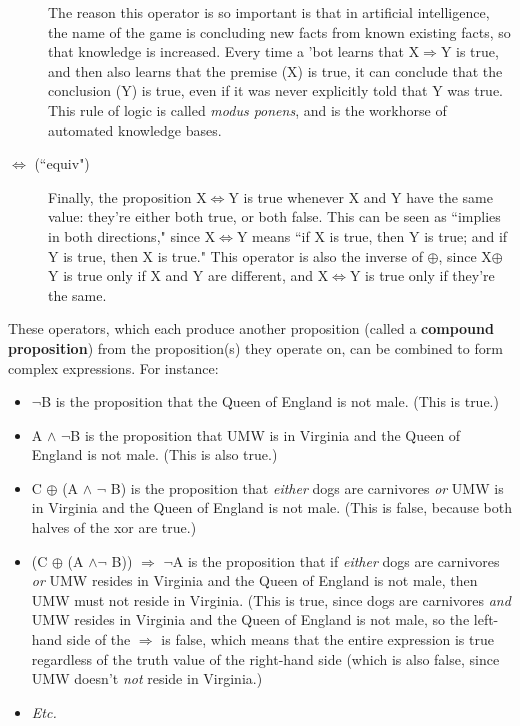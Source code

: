 \begin{description}
The reason this operator is so important is that in artificial
intelligence, the name of the game is concluding new facts from known
existing facts, so that knowledge is increased. Every time a 'bot learns
that X$\Rightarrow$Y is true, and then also learns that the premise (X) is
true, it can conclude that the conclusion (Y) is true, even if it was
never explicitly told that Y was true. This rule of logic is called
\textit{modus ponens}, and is the workhorse of automated knowledge bases.

\item[$\Leftrightarrow$ (``equiv")] Finally, the proposition
X$\Leftrightarrow$Y is true whenever X and Y have the same value: they're
either both true, or both false. This can be seen as ``implies in both
directions," since X$\Leftrightarrow$Y means ``if X is true, then Y is
true; and if Y is true, then X is true." This operator is also the inverse
of $\oplus$, since X$\oplus$Y is true only if X and Y are different, and
X$\Leftrightarrow$Y is true only if they're the same.

\end{description}

These operators, which each produce another proposition (called a
\textbf{compound proposition}) from the proposition(s) they operate on, can
be combined to form complex expressions. For instance:

\begin{itemize}
\item $\neg$B is the proposition that the Queen of England is not male.
(This is true.)
\item A $\wedge$ $\neg$B is the proposition that UMW is in Virginia and the
Queen of England is not male. (This is also true.)
\item C $\oplus$ (A $\wedge$ $\neg$ B) is the proposition that \textit{either}
dogs are carnivores \textit{or} UMW is in Virginia and the Queen of England
is not male. (This is false, because both halves of the xor are true.)
\item (C $\oplus$ (A $\wedge \neg$ B)) $\Rightarrow$ $\neg$A is the
proposition that if \textit{either} dogs are carnivores \textit{or} UMW
resides in Virginia and the Queen of England is not male, then UMW must not
reside in Virginia. (This is true, since dogs are carnivores \textit{and}
UMW resides in Virginia and the Queen of England is not male, so the
left-hand side of the $\Rightarrow$ is false, which means that the entire
expression is true regardless of the truth value of the right-hand side
(which is also false, since UMW doesn't \textit{not} reside in Virginia.)
\item \textit{Etc.}

\end{itemize}


